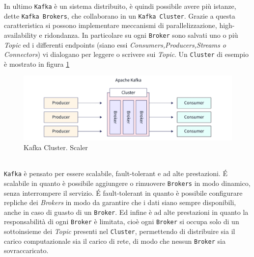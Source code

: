 In ultimo \texttt{Kafka} è un sistema distribuito, è quindi possibile avere più istanze, dette \texttt{Kafka Brokers}, che collaborano in un \texttt{Kafka Cluster}. Grazie a questa caratteristica si possono implementare meccanismi di parallelizzazione, high-availability e ridondanza.
In particolare su ogni \texttt{Broker} sono salvati uno o più \textit{Topic} ed i differenti endpoints (siano essi \textit{Consumers,Producers,Streams o Connectors}) vi dialogano per leggere o scrivere sui \textit{Topic}.
Un \texttt{Cluster} di esempio è mostrato in figura \ref{fig:kafka_cluster}
\begin{figure}[htbp]
    \centering
    \includegraphics[width=\textwidth]{images/kafka/cluster.jpg}
    \caption{Kafka Cluster. Scaler \cite{kafkaScaler}}
    \label{fig:kafka_cluster}
\end{figure}
\\\texttt{Kafka} è pensato per essere scalabile, fault-tolerant e ad alte prestazioni.
É scalabile in quanto è possibile aggiungere o rimuovere \texttt{Brokers} in modo dinamico, senza interrompere il servizio.
É fault-tolerant in quanto è possibile configurare repliche dei \textit{Brokers} in modo da garantire che i dati siano sempre disponibili, anche in caso di guasto di un \texttt{Broker}.
Ed infine è ad alte prestazioni in quanto la responsabilità di ogni \texttt{Broker} è limitata, cioè ogni \texttt{Broker} si occupa solo di un sottoinsieme dei \textit{Topic} presenti nel \texttt{Cluster}, 
permettendo di distribuire sia il carico computazionale sia il carico di rete, di modo che nessun \texttt{Broker} sia sovraccaricato.

